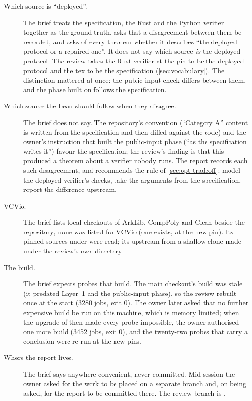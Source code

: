 \begin{description}
\item[Which source is \enquote{deployed}.] The brief treats the specification, the Rust and
  the Python verifier together as the ground truth, asks that a disagreement between them be
  recorded, and asks of every theorem whether it describes \enquote{the deployed protocol or
  a repaired one}. It does not say which source \emph{is} the deployed protocol. The review
  takes the Rust verifier at the pin to be the deployed protocol and the tex to be the
  specification (\cref{sec:vocabulary}). The distinction mattered at once: the public-input
  check differs between them, and the phase built on  follows the specification.
\item[Which source the Lean should follow when they disagree.] The brief does not say. The
  repository's convention (\enquote{Category A} content is written from the specification and
  then diffed against the code) and the owner's instruction that built the public-input phase
  (\enquote{as the specification writes it}) favour the specification; the review's finding is
  that this produced a theorem about a verifier nobody runs. The report records each such
  disagreement, and recommends the rule of \cref{sec:opt-tradeoff}: model the deployed
  verifier's checks, take the arguments from the specification, report the difference upstream.
\item[VCVio.] The brief lists local checkouts of ArkLib, CompPoly and Clean beside the
  repository; none was listed for VCVio (one exists, at the new pin). Its pinned sources under
   were read; its upstream  from a shallow clone made
  under the review's own directory.
\item[The build.] The brief expects probes that build. The main checkout's build was stale
  (it predated Layer~1 and the public-input phase), so the review rebuilt  once at
  the start (3280 jobs, exit 0). The owner later asked that no further expensive build be run
  on this machine, which is memory limited; when the upgrade of  then made every
  probe impossible, the owner authorised one more build (3452 jobs, exit 0), and the twenty-two
  probes that carry a conclusion were re-run at the new pins.
\item[Where the report lives.] The brief says anywhere convenient, never committed. Mid-session
  the owner asked for the work to be placed on a separate branch and, on being asked, for the
  report to be committed there. The review branch is ,

\end{description}
